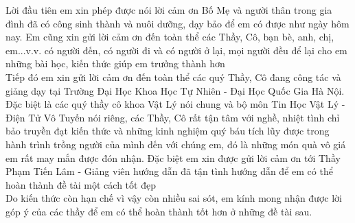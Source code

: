 \documentclass[
12pt,
oneside,
english,
doublespacing,
nolistspacing,
liststotoc,
parskip,
headsepline,
chapterinoneline,
]{HUSdissertation}
\author{NGUYỄN THẾ PHONG} 			%
\begin{document}
\lstset{style=codeC}	%

\frontmatter 			%

\pagestyle{plain} 


%







%
%



\begin{acknowledgements}
	\addchaptertocentry{\acknowledgementname}
	\thispagestyle{empty}
	Lời đầu tiên em xin phép được nói lời cảm ơn Bố Mẹ và người thân trong gia đình đã
	có công sinh thành và nuôi dưỡng, dạy bảo để em có được như ngày hôm nay. Em cũng
	xin gửi lời cảm ơn đến toàn thể các Thầy, Cô, bạn bè, anh, chị, em...v.v. có người đến, có
	người đi và có người ở lại, mọi người đều để lại cho em những bài học, kiến thức giúp
	em trưởng thành hơn \\
	Tiếp đó em xin gửi lời cảm ơn đến toàn thể các quý Thầy, Cô đang công tác và giảng
	dạy tại Trường Đại Học Khoa Học Tự Nhiên - Đại Học Quốc Gia Hà Nội. Đặc biệt là
	các quý thầy cô khoa Vật Lý nói chung và bộ môn Tin Học Vật Lý - Điện Tử Vô Tuyến
	nói riêng, các Thầy, Cô rất tận tâm với nghề, nhiệt tình chỉ bảo truyền đạt kiến thức và
	những kinh nghiệm quý báu tích lũy được trong hành trình trồng người của mình đến
	với chúng em, đó là những món quà vô giá em rất may mắn được đón nhận. Đặc biệt em xin được gửi lời cảm ơn tới Thầy Phạm Tiến Lâm - Giảng viên hướng dẫn đã tận tình hướng dẫn để em có thể hoàn thành đề tài một cách tốt đẹp \\
	Do kiến thức còn hạn chế vì vậy còn nhiều sai sót, em kính mong nhận được lời góp ý của các thầy để em có thể hoàn thành tốt hơn ở những đề tài sau.

\end{acknowledgements}
\end{document}
